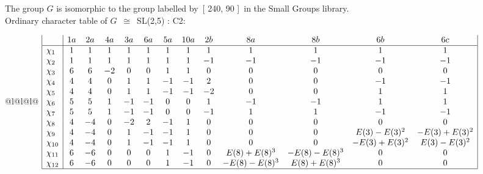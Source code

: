 \documentclass[varwidth=\maxdimen,border=10]{standalone}
\begin{document}
The group $G$ is isomorphic to the group labelled by\ [ 240, 90 ]\ in the Small Groups library.\\
Ordinary character table of $G$\ $\cong$\ SL(2,5) : C2:\\
\begin{center}
\begin{tabular}{@{}l@{}l@{}l@{}}
\hline
\(\begin{array}{|l|cccccccccccc|}
  & 1a & 2a & 4a & 3a & 6a & 5a & 10a & 2b & 8a & 8b & 6b & 6c\\ \hline
\chi_{1} & 1 & 1 & 1 & 1 & 1 & 1 & 1 & 1 & 1 & 1 & 1 & 1\\
\chi_{2} & 1 & 1 & 1 & 1 & 1 & 1 & 1 & -1 & -1 & -1 & -1 & -1\\
\chi_{3} & 6 & 6 & -2 & 0 & 0 & 1 & 1 & 0 & 0 & 0 & 0 & 0\\
\chi_{4} & 4 & 4 & 0 & 1 & 1 & -1 & -1 & 2 & 0 & 0 & -1 & -1\\
\chi_{5} & 4 & 4 & 0 & 1 & 1 & -1 & -1 & -2 & 0 & 0 & 1 & 1\\
\chi_{6} & 5 & 5 & 1 & -1 & -1 & 0 & 0 & 1 & -1 & -1 & 1 & 1\\
\chi_{7} & 5 & 5 & 1 & -1 & -1 & 0 & 0 & -1 & 1 & 1 & -1 & -1\\
\chi_{8} & 4 & -4 & 0 & -2 & 2 & -1 & 1 & 0 & 0 & 0 & 0 & 0\\
\chi_{9} & 4 & -4 & 0 & 1 & -1 & -1 & 1 & 0 & 0 & 0 & E(3)-E(3)^{2} & -E(3)+E(3)^{2}\\
\chi_{10} & 4 & -4 & 0 & 1 & -1 & -1 & 1 & 0 & 0 & 0 & -E(3)+E(3)^{2} & E(3)-E(3)^{2}\\
\chi_{11} & 6 & -6 & 0 & 0 & 0 & 1 & -1 & 0 & E(8)+E(8)^{3} & -E(8)-E(8)^{3} & 0 & 0\\
\chi_{12} & 6 & -6 & 0 & 0 & 0 & 1 & -1 & 0 & -E(8)-E(8)^{3} & E(8)+E(8)^{3} & 0 & 0\\
\hline
\end{array}\)\\
\end{tabular}
\end{center}
\end{document}

